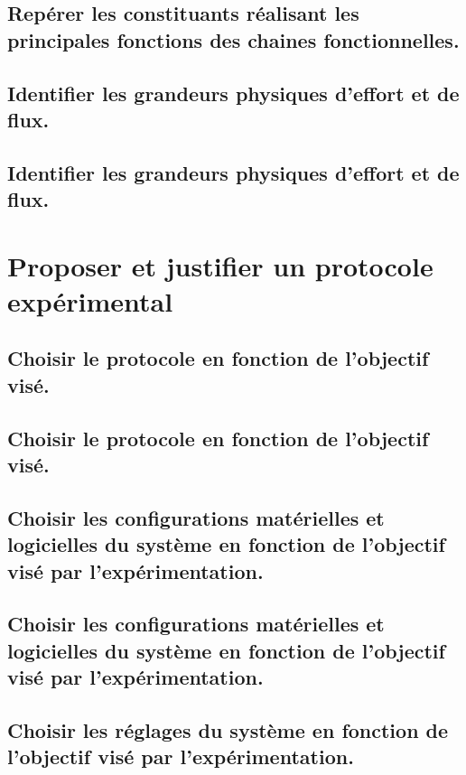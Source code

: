 \documentclass[10pt,fleqn]{book}
\begin{document}
\subsection{Repérer les constituants réalisant les principales fonctions des chaines fonctionnelles.} 

\subsection{Identifier les grandeurs physiques d’effort et de flux.} 

\subsection{Identifier les grandeurs physiques d’effort et de flux.} 

\section{Proposer et justifier un protocole expérimental} 

\subsection{Choisir le protocole en fonction de l'objectif visé.} 

\subsection{Choisir le protocole en fonction de l'objectif visé.} 

\subsection{Choisir les configurations matérielles et logicielles du système en fonction de l'objectif visé par l'expérimentation.} 

\subsection{Choisir les configurations matérielles et logicielles du système en fonction de l'objectif visé par l'expérimentation.} 

\subsection{Choisir les réglages du système en fonction de l'objectif visé par l'expérimentation.} 
\end{document}

